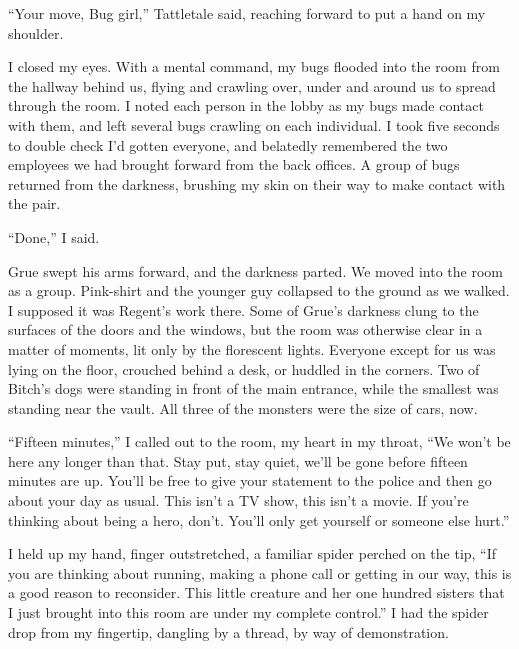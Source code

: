 ``Your move, Bug girl,'' Tattletale said, reaching forward to put a hand on my shoulder.



I closed my eyes.  With a mental command, my bugs flooded into the room from the hallway behind us, flying and crawling over, under and around us to spread through the room.  I noted each person in the lobby as my bugs made contact with them, and left several bugs crawling on each individual.  I took five seconds to double check I'd gotten everyone, and belatedly remembered the two employees we had brought forward from the back offices.  A group of bugs returned from the darkness, brushing my skin on their way to make contact with the pair.



``Done,'' I said.



Grue swept his arms forward, and the darkness parted.  We moved into the room as a group.  Pink-shirt and the younger guy collapsed to the ground as we walked.  I supposed it was Regent's work there.  Some of Grue's darkness clung to the surfaces of the doors and the windows, but the room was otherwise clear in a matter of moments, lit only by the florescent lights.  Everyone except for us was lying on the floor, crouched behind a desk, or huddled in the corners.  Two of Bitch's dogs were standing in front of the main entrance, while the smallest was standing near the vault.  All three of the monsters were the size of cars, now.



``Fifteen minutes,'' I called out to the room, my heart in my throat, ``We won't be here any longer than that.  Stay put, stay quiet, we'll be gone before fifteen minutes are up.  You'll be free to give your statement to the police and then go about your day as usual.  This isn't a TV show, this isn't a movie.  If you're thinking about being a hero, don't.  You'll only get yourself or someone else hurt.''



I held up my hand, finger outstretched, a familiar spider perched on the tip, ``If you are thinking about running, making a phone call or getting in our way, this is a good reason to reconsider.  This little creature and her one hundred sisters that I just brought into this room are under my complete control.''  I had the spider drop from my fingertip, dangling by a thread, by way of demonstration.



